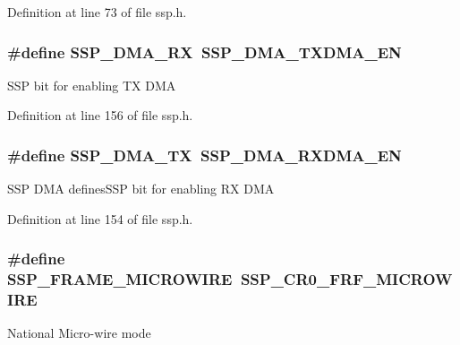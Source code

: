Definition at line 73 of file ssp.\+h.

\subsubsection[{\texorpdfstring{S\+S\+P\+\_\+\+D\+M\+A\+\_\+\+RX}{SSP_DMA_RX}}]{\setlength{\rightskip}{0pt plus 5cm}\#define S\+S\+P\+\_\+\+D\+M\+A\+\_\+\+RX~{\bf S\+S\+P\+\_\+\+D\+M\+A\+\_\+\+T\+X\+D\+M\+A\+\_\+\+EN}}\hypertarget{group___s_s_p___public___macros_gac294ff35d73ad16084bd157fec3bcfc6}{}\label{group___s_s_p___public___macros_gac294ff35d73ad16084bd157fec3bcfc6}
S\+SP bit for enabling TX D\+MA 

Definition at line 156 of file ssp.\+h.

\subsubsection[{\texorpdfstring{S\+S\+P\+\_\+\+D\+M\+A\+\_\+\+TX}{SSP_DMA_TX}}]{\setlength{\rightskip}{0pt plus 5cm}\#define S\+S\+P\+\_\+\+D\+M\+A\+\_\+\+TX~{\bf S\+S\+P\+\_\+\+D\+M\+A\+\_\+\+R\+X\+D\+M\+A\+\_\+\+EN}}\hypertarget{group___s_s_p___public___macros_ga442c2b693b567292aaa17bdba6789094}{}\label{group___s_s_p___public___macros_ga442c2b693b567292aaa17bdba6789094}
S\+SP D\+MA defines\+S\+SP bit for enabling RX D\+MA 

Definition at line 154 of file ssp.\+h.

\subsubsection[{\texorpdfstring{S\+S\+P\+\_\+\+F\+R\+A\+M\+E\+\_\+\+M\+I\+C\+R\+O\+W\+I\+RE}{SSP_FRAME_MICROWIRE}}]{\setlength{\rightskip}{0pt plus 5cm}\#define S\+S\+P\+\_\+\+F\+R\+A\+M\+E\+\_\+\+M\+I\+C\+R\+O\+W\+I\+RE~{\bf S\+S\+P\+\_\+\+C\+R0\+\_\+\+F\+R\+F\+\_\+\+M\+I\+C\+R\+O\+W\+I\+RE}}\hypertarget{group___s_s_p___public___macros_gab908ae3d749411618396107e2e0c635e}{}\label{group___s_s_p___public___macros_gab908ae3d749411618396107e2e0c635e}
National Micro-\/wire mode 

